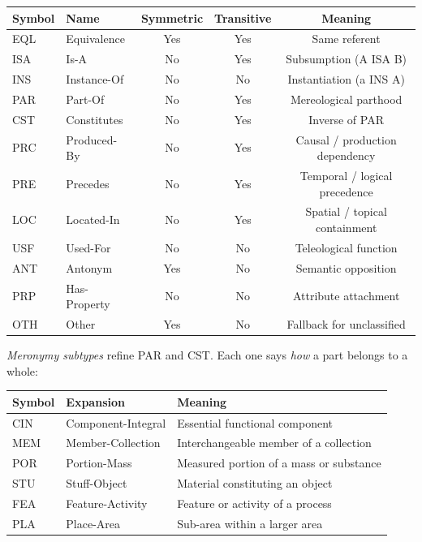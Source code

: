 \begin{table}[h]
\centering
\begin{tabular}{llccc}
\toprule
Symbol & Name & Symmetric & Transitive & Meaning \\
\midrule
EQL & Equivalence & Yes & Yes & Same referent \\
ISA & Is-A & No & Yes & Subsumption (A ISA B) \\
INS & Instance-Of & No & No & Instantiation (a INS A) \\
PAR & Part-Of & No & Yes & Mereological parthood \\
CST & Constitutes & No & Yes & Inverse of PAR \\
PRC & Produced-By & No & Yes & Causal / production dependency \\
PRE & Precedes & No & Yes & Temporal / logical precedence \\
LOC & Located-In & No & Yes & Spatial / topical containment \\
USF & Used-For & No & No & Teleological function \\
ANT & Antonym & Yes & No & Semantic opposition \\
PRP & Has-Property & No & No & Attribute attachment \\
OTH & Other & Yes & No & Fallback for unclassified \\
\bottomrule
\end{tabular}
\end{table}

\textit{Meronymy subtypes} refine PAR and CST. Each one says \textit{how} a part belongs to a whole:

\begin{table}[h]
\centering
\begin{tabular}{lll}
\toprule
Symbol & Expansion & Meaning \\
\midrule
CIN & Component-Integral & Essential functional component \\
MEM & Member-Collection & Interchangeable member of a collection \\
POR & Portion-Mass & Measured portion of a mass or substance \\
STU & Stuff-Object & Material constituting an object \\
FEA & Feature-Activity & Feature or activity of a process \\
PLA & Place-Area & Sub-area within a larger area \\
\bottomrule
\end{tabular}
\end{table}

